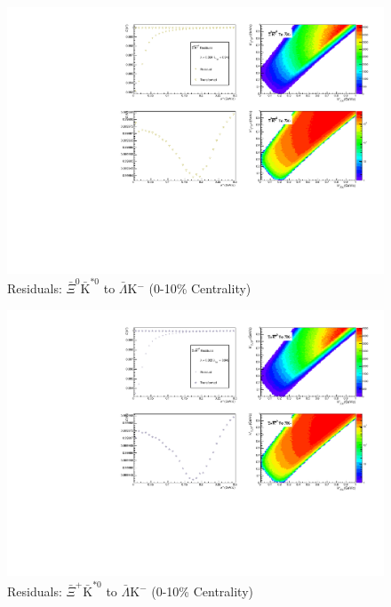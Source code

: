 \documentclass[../AnalysisNoteJBuxton.tex]{subfiles}
\begin{document}
\begin{figure}[h]
  \centering
  \includegraphics[width=\textwidth]{9_AdditionalFigures/Figures/Residuals/ALamKchM/Residuals_ALamKchM_0010_AXi0AKSt0_MomResCrctn_NonFlatBgdCrctn_ResidualsIncluded_UsingCoulombOnlyInterpCfs.pdf}
  \caption[Residuals: $\bar{\Xi}^{0}\bar{\mathrm{K}}^{*0}$ to $\bar{\Lambda}$K$^{-}$ (0-10\% Centrality)]{Residuals: $\bar{\Xi}^{0}\bar{\mathrm{K}}^{*0}$ to $\bar{\Lambda}$K$^{-}$ (0-10\% Centrality)}
  \label{fig:Res_ALamKchM_0010_AXi0AKSt0}
\end{figure}

\begin{figure}[h]
  \centering
  \includegraphics[width=\textwidth]{9_AdditionalFigures/Figures/Residuals/ALamKchM/Residuals_ALamKchM_0010_AXiAKSt0_MomResCrctn_NonFlatBgdCrctn_ResidualsIncluded_UsingCoulombOnlyInterpCfs.pdf}
  \caption[Residuals: $\bar{\Xi}^{+}\bar{\mathrm{K}}^{*0}$ to $\bar{\Lambda}$K$^{-}$ (0-10\% Centrality)]{Residuals: $\bar{\Xi}^{+}\bar{\mathrm{K}}^{*0}$ to $\bar{\Lambda}$K$^{-}$ (0-10\% Centrality)}
  \label{fig:Res_ALamKchM_0010_AXiCAKSt0}
\end{figure}
\end{document}
